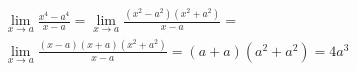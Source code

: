 \begin{ex}
\begin{align}
&\lim_{x\rightarrow a} \frac{x^4-a^4}{x-a}=\lim_{x\rightarrow a} \frac{(x^2-a^2)(x^2+a^2)}{x-a}=\nonumber\\
&\lim_{x\rightarrow a} \frac{(x-a)(x+a)(x^2+a^2)}{x-a}=(a+a)(a^2+a^2)=4a^3\nonumber
\end{align}
\end{ex}
